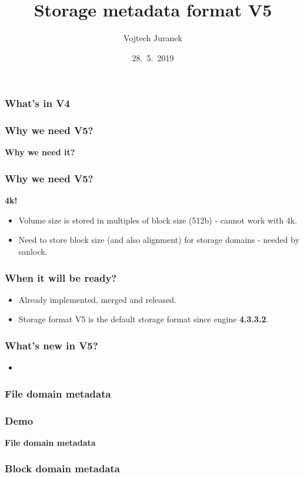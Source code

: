 \documentclass[10pt,utf8]{beamer}
\title{Storage metadata format V5}
\author{Vojtech Juranek}
\institute[Red Hat]{oVirt storage team}
\date{28.~5.~2019}
\begin{document}
\begin{frame}
 \titlepage
\end{frame}

\begin{frame}
	\frametitle{What's in V4}
\end{frame}

\begin{frame}
  \frametitle{Why we need V5?}
	\centering
	\huge{\textbf{Why we need it?}}
\end{frame}

\begin{frame}
  \frametitle{Why we need V5?}
	\centering
	\huge{\textbf{4k!}}
	\normalsize
	\vspace{1cm}
	\begin{itemize}
		\pause
		\item Volume size is stored in multiples of block size (512b) - cannot work with 4k.
		\pause
		\item Need to store block size (and also alignment) for storage domains - needed by sanlock.
	\end{itemize}
\end{frame}

\begin{frame}
	\frametitle{When it will be ready?}
	\begin{itemize}
		\item Already implemented, merged and released.
		\item Storage format V5 is the default storage format since engine \textbf{4.3.3.2}.
	\end{itemize}
\end{frame}

\begin{frame}
	\frametitle{What's new in V5?}
	\begin{itemize}
		\item 
	\end{itemize}
\end{frame}

\begin{frame}
	\frametitle{File domain metadata}
\end{frame}

\begin{frame}
  \frametitle{Demo}
	\centering
	\huge{\textbf{File domain metadata}}
\end{frame}

\begin{frame}
	\frametitle{Block domain metadata}
\end{frame}
\end{document}
